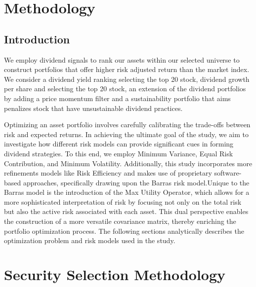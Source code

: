 \documentclass[11pt,preprint, authoryear]{elsarticle}
\numberwithin{equation}{section}
\numberwithin{figure}{section}
\numberwithin{table}{section}
\begin{document}
\hypertarget{methodology}{%
\section*{Methodology}\label{methodology}}

\hypertarget{introduction-1}{%
\subsection{Introduction}\label{introduction-1}}

We employ dividend signals to rank our assets within our selected
universe to construct portfolios that offer higher risk adjusted return
than the market index. We consider a dividend yield ranking selecting
the top 20 stock, dividend growth per share and selecting the top 20
stock, an extension of the dividend portfolios by adding a price
momentum filter and a sustainability portfolio that aims penalizes stock
that have unsustainable dividend practices.

Optimizing an asset portfolio involves carefully calibrating the
trade-offs between risk and expected returns. In achieving the ultimate
goal of the study, we aim to investigate how different risk models can
provide significant cues in forming dividend strategies. To this end, we
employ Minimum Variance, Equal Risk Contribution, and Minimum
Volatility. Additionally, this study incorporates more refinements
models like Risk Efficiency and makes use of proprietary software-based
approaches, specifically drawing upon the Barras risk model.Unique to
the Barras model is the introduction of the Max Utility Operator, which
allows for a more sophisticated interpretation of risk by focusing not
only on the total risk but also the active risk associated with each
asset. This dual perspective enables the construction of a more
versatile covariance matrix, thereby enriching the portfolio
optimization process. The following sections analytically describes the
optimization problem and risk models used in the study.

\hypertarget{security-selection-methodology}{%
\section{Security Selection
Methodology}\label{security-selection-methodology}}
\end{document}

